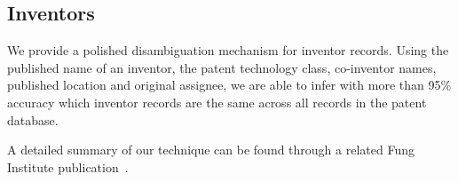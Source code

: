 \subsection{Inventors}

We provide a polished disambiguation mechanism for inventor records. Using the
published name of an inventor, the patent technology class, co-inventor names,
published location and original assignee, we are able to infer with more than
95\% accuracy which inventor records are the same across all records in the
patent database.

A detailed summary of our technique can be found through a related Fung
Institute publication~\cite{newdisambiguation}.
